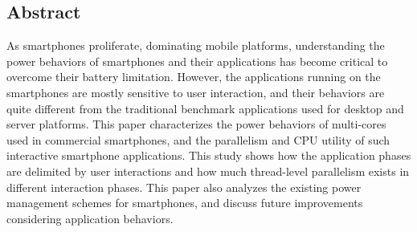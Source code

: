 \subsection*{Abstract}

As smartphones proliferate, dominating mobile platforms, understanding 
the power behaviors of smartphones and their applications 
has become critical to overcome their battery limitation. However, 
the applications running on the smartphones
are mostly sensitive to user interaction, and their behaviors are quite
different from the traditional benchmark applications used for desktop and
server platforms. This paper characterizes the power behaviors of
multi-cores used in commercial smartphones, and the parallelism and CPU utility
of such interactive smartphone applications. This study shows how the application
phases are delimited by user interactions and how much thread-level parallelism
exists in different interaction phases. This paper also analyzes the existing 
power management schemes for smartphones, and discuss future improvements 
considering application behaviors.

